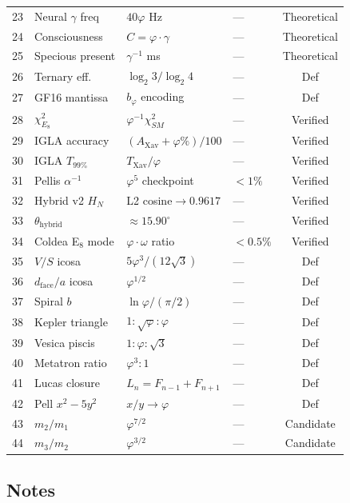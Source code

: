 \begin{longtable}{clllc}
23 & Neural $\gamma$ freq & $40\varphi$ Hz & --- & Theoretical \\
24 & Consciousness & $C=\varphi\cdot\gamma$ & --- & Theoretical \\
25 & Specious present & $\gamma^{-1}$ ms & --- & Theoretical \\
26 & Ternary eff. & $\log_2 3/\log_2 4$ & --- & Def \\
27 & GF16 mantissa & $b_{\varphi}$ encoding & --- & Def \\
28 & $\chi^2_{E_8}$ & $\varphi^{-1}\chi^2_{SM}$ & --- & Verified \\
29 & IGLA accuracy & $(A_{\text{Xav}}+\varphi\%)/100$ & --- & Verified \\
30 & IGLA $T_{99\%}$ & $T_{\text{Xav}}/\varphi$ & --- & Verified \\
31 & Pellis $\alpha^{-1}$ & $\varphi^5$ checkpoint & $<1\%$ & Verified \\
32 & Hybrid v2 $H_N$ & L2 cosine$\to 0.9617$ & --- & Verified \\
33 & $\theta_{\text{hybrid}}$ & $\approx 15.90^\circ$ & --- & Verified \\
34 & Coldea E$_8$ mode & $\varphi\cdot\omega$ ratio & $<0.5\%$ & Verified \\
35 & $V/S$ icosa & $5\varphi^3/(12\sqrt{3})$ & --- & Def \\
36 & $d_{\text{face}}/a$ icosa & $\varphi^{1/2}$ & --- & Def \\
37 & Spiral $b$ & $\ln\varphi/(\pi/2)$ & --- & Def \\
38 & Kepler triangle & $1:\sqrt{\varphi}:\varphi$ & --- & Def \\
39 & Vesica piscis & $1:\varphi:\sqrt{3}$ & --- & Def \\
40 & Metatron ratio & $\varphi^3:1$ & --- & Def \\
41 & Lucas closure & $L_n=F_{n-1}+F_{n+1}$ & --- & Def \\
42 & Pell $x^2-5y^2$ & $x/y\to\varphi$ & --- & Def \\
43 & $m_2/m_1$ & $\varphi^{7/2}$ & --- & Candidate \\
44 & $m_3/m_2$ & $\varphi^{3/2}$ & --- & Candidate \\
\end{longtable}

\subsection*{Notes}

